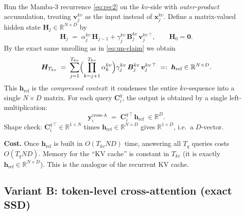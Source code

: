 \documentclass[11pt,a4paper]{article}
\begin{document}
Run the Mamba-3 recurrence \eqref{eq:rec2} on the $kv$-side with
\emph{outer-product} accumulation, treating $\bm{v}_j^{kv}$ as the
input instead of $\bm{x}_j^{kv}$. Define a matrix-valued hidden state
$\bm{H}_j \in \mathbb{R}^{N\times D}$ by
\begin{equation}\label{eq:Hrec}
  \bm{H}_j \;=\; \alpha_j^{kv}\,\bm{H}_{j-1}
                + \gamma_j^{kv}\,\bm{B}_j^{kv}\,\bm{v}_j^{kv\,\top},
  \qquad \bm{H}_0 = \bm{0}.
\end{equation}
By the exact same unrolling as in \eqref{eq:un-claim} we obtain
\begin{equation}\label{eq:Hclose}
  \bm{H}_{T_{kv}} \;=\; \sum_{j=1}^{T_{kv}}
      \Bigl(\prod_{k=j+1}^{T_{kv}}\alpha_k^{kv}\Bigr)
      \gamma_j^{kv}\,\bm{B}_j^{kv}\,\bm{v}_j^{kv\,\top}
  \;=:\; \bm{h}_{\text{ref}} \in \mathbb{R}^{N\times D}.
\end{equation}
This $\bm{h}_{\text{ref}}$ is the \emph{compressed context}: it
condenses the entire $kv$-sequence into a single $N\times D$ matrix.
For each query $\bm{C}_i^q$, the output is obtained by a single
left-multiplication:
\begin{equation}\label{eq:crossA-out}
  \boxed{\;\bm{y}_i^{\text{cross-A}} \;=\; \bm{C}_i^{q\,\top}\,\bm{h}_{\text{ref}} \;\in \mathbb{R}^{D}.\;}
\end{equation}
Shape check: $\bm{C}_i^{q\,\top}\in\mathbb{R}^{1\times N}$ times
$\bm{h}_{\text{ref}}\in\mathbb{R}^{N\times D}$ gives
$\mathbb{R}^{1\times D}$, i.e.\ a $D$-vector.

\textbf{Cost.} Once $\bm{h}_{\text{ref}}$ is built in $O(T_{kv}ND)$
time, answering all $T_q$ queries costs $O(T_q ND)$. Memory for the
``KV cache'' is constant in $T_{kv}$ (it is exactly
$\bm{h}_{\text{ref}}\in\mathbb{R}^{N\times D}$). This is the
analogue of the recurrent KV cache.

\subsection{Variant B: token-level cross-attention (exact SSD)}
\label{sec:crossB}
\end{document}
